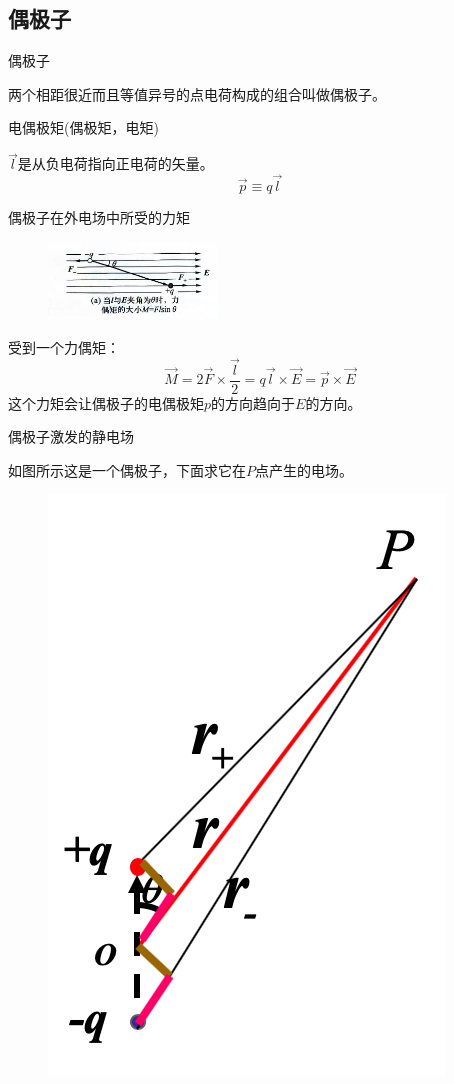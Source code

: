 \documentclass[cn,hazy,blue,14pt,normal]{elegantnote}
\numberwithin{equation}{section}
\begin{document}
\subsection{偶极子}
\begin{definition}
	偶极子
\end{definition}
两个相距很近而且等值异号的点电荷构成的组合叫做偶极子。
\begin{definition}
	电偶极矩(偶极矩，电矩)
\end{definition}
$\vec{l}$是从负电荷指向正电荷的矢量。
$$\vec{p} \equiv q\vec{l}$$
\begin{theorem}
	偶极子在外电场中所受的力矩
\end{theorem}
\begin{figure}
	\includegraphics[width=0.4\textwidth]{image/偶极子.jpg}
\end{figure}
受到一个力偶矩：
$$\vec{M}=2\vec{F}\times\frac{\vec{l}}{2}=q\vec{l}\times\vec{E}=\vec{p}\times\vec{E}$$
这个力矩会让偶极子的电偶极矩$p$的方向趋向于$E$的方向。
\begin{theorem}
	偶极子激发的静电场
\end{theorem}
如图所示这是一个偶极子，下面求它在$P$点产生的电场。
\begin{figure}
	\includegraphics[scale=0.5]{image/偶极子电场.png}
\end{figure}
\end{document}
